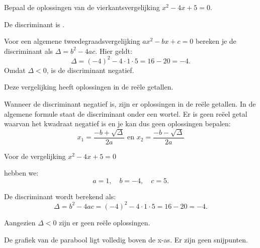 \documentclass{ximera}
\begin{document}
\begin{exercise}

    Bepaal de oplossingen van de vierkantsvergelijking \( x^2 - 4x + 5 = 0 \). 
    
    
    \begin{question}
    De discriminant is \choicenegatief.
    \begin{feedback}
        Voor een algemene tweedegraadsvergelijking \(ax^2 - bx + c = 0\) bereken je de discriminant als \(\Delta = b^2 - 4ac\). 
        Hier geldt: 
        \[
        \Delta = (-4)^2 - 4\cdot1\cdot5 = 16 - 20 = -4.
        \]
        Omdat \(\Delta < 0\), is de discriminant negatief.
    \end{feedback}
    \end{question}
    
    \begin{question}
    Deze vergelijking heeft \choicenul oplossingen in de reële getallen.
    \begin{feedback}
        Wanneer de discriminant negatief is, zijn er oplossingen in de reële getallen. 
        In de algemene formule staat de discriminant onder een wortel. 
        Er is geen reëel getal waarvan het kwadraat negatief is en je kan dus geen oplossingen bepalen: 
        \[
        x_{1} = \frac{-b + \sqrt{\Delta}}{2a}  \text{ en }  x_{2} = \frac{-b - \sqrt{\Delta}}{2a}
        \]

    \end{feedback}
    \end{question}
    
    \begin{oplossing}
    Voor de vergelijking \( x^2 - 4x + 5 = 0 \)
    
    hebben we:
    \[
    a = 1,\quad b = -4,\quad c = 5.
    \]
    
    De discriminant wordt berekend als:
    \[
    \Delta = b^2 - 4ac = (-4)^2 - 4\cdot1\cdot5 = 16 - 20 = -4.
    \]
    
    Aangezien \(\Delta < 0\) zijn er geen reële oplossingen. 

    De grafiek van de parabool ligt volledig boven de x-as. Er zijn geen snijpunten. 
    \begin{image}
    \end{image}

    
    \end{oplossing}
    
\end{exercise}
    
\end{document}
